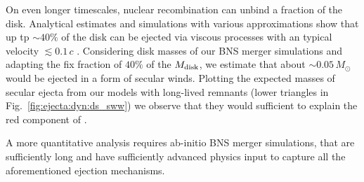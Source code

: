 %



On even longer timescales, 
nuclear recombination can unbind a fraction of the disk.  
%
Analytical estimates and simulations with various approximations show that 
up tp ${\sim}40\%$ of the disk can be ejected via viscous processes with an 
typical velocity ${\lesssim}0.1\,c$ 
\citep[\eg][]{Siegel:2017nub,Fujibayashi:2017puw,Fernandez:2018kax,
    Radice:2018xqa,Fujibayashi:2020dvr}. 
%
Considering disk masses of our \ac{BNS} merger simulations and 
adapting the fix fraction of $40\%$ of the $M_{\rm disk}$, we estimate 
that about ${\sim}0.05\, M_{\odot}$ would be ejected in a form of 
secular winds. 
%
Plotting the expected masses of secular ejecta from our models with long-lived 
remnants (lower triangles in Fig.~\ref{fig:ejecta:dyn:ds_sww})  
we observe that they would sufficient to explain the red component of 
\AT{}. 


A more quantitative analysis requires ab-initio \ac{BNS} merger simulations, 
that are sufficiently long and have sufficiently advanced physics input to 
capture all the aforementioned ejection mechanisms. 








%
%








